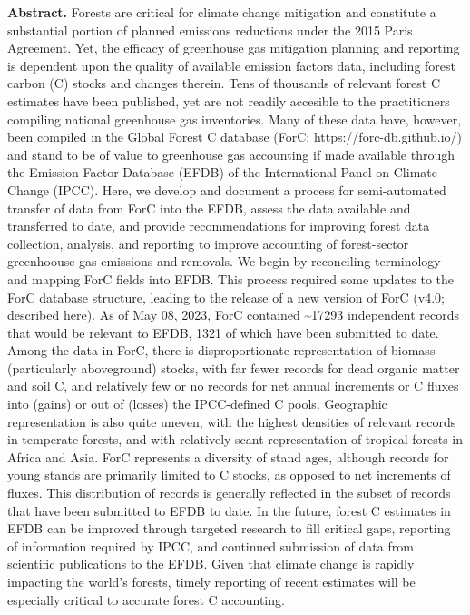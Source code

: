 \documentclass[, manuscript]{copernicus}
\begin{document}
\textbf{Abstract.} Forests are critical for climate change mitigation
and constitute a substantial portion of planned emissions reductions
under the 2015 Paris Agreement. Yet, the efficacy of greenhouse gas
mitigation planning and reporting is dependent upon the quality of
available emission factors data, including forest carbon (C) stocks and
changes therein. Tens of thousands of relevant forest C estimates have
been published, yet are not readily accesible to the practitioners
compiling national greenhouse gas inventories. Many of these data have,
however, been compiled in the Global Forest C database (ForC;
https://forc-db.github.io/) and stand to be of value to greenhouse gas
accounting if made available through the Emission Factor Database (EFDB)
of the International Panel on Climate Change (IPCC). Here, we develop
and document a process for semi-automated transfer of data from ForC
into the EFDB, assess the data available and transferred to date, and
provide recommendations for improving forest data collection, analysis,
and reporting to improve accounting of forest-sector greenhoouse gas
emissions and removals. We begin by reconciling terminology and mapping
ForC fields into EFDB. This process required some updates to the ForC
database structure, leading to the release of a new version of ForC
(v4.0; described here). As of May 08, 2023, ForC contained
\textasciitilde17293 independent records that would be relevant to EFDB,
1321 of which have been submitted to date. Among the data in ForC, there
is disproportionate representation of biomass (particularly aboveground)
stocks, with far fewer records for dead organic matter and soil C, and
relatively few or no records for net annual increments or C fluxes into
(gains) or out of (losses) the IPCC-defined C pools. Geographic
representation is also quite uneven, with the highest densities of
relevant records in temperate forests, and with relatively scant
representation of tropical forests in Africa and Asia. ForC represents a
diversity of stand ages, although records for young stands are primarily
limited to C stocks, as opposed to net increments of fluxes. This
distribution of records is generally reflected in the subset of records
that have been submitted to EFDB to date. In the future, forest C
estimates in EFDB can be improved through targeted research to fill
critical gaps, reporting of information required by IPCC, and continued
submission of data from scientific publications to the EFDB. Given that
climate change is rapidly impacting the world's forests, timely
reporting of recent estimates will be especially critical to accurate
forest C accounting.
\end{document}
